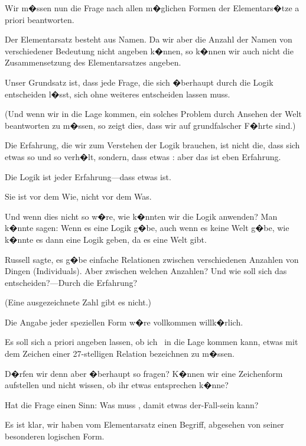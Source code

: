 \begin{propositions}
{Wir m�ssen nun die Frage nach allen m�glichen
Formen der Elementars�tze a priori beantworten.

Der Elementarsatz besteht aus Namen. Da wir
aber die Anzahl der Namen von verschiedener
Bedeutung nicht angeben k�nnen, so k�nnen wir
auch nicht die Zusammensetzung des Elementarsatzes
angeben.}


{Unser Grundsatz ist, dass jede Frage, die sich
�berhaupt durch die Logik entscheiden l�sst, sich
ohne weiteres entscheiden lassen muss.

(Und wenn wir in die Lage kommen, ein solches
Problem durch Ansehen der Welt beantworten zu
m�ssen, so zeigt dies, dass wir auf grundfalscher
F�hrte sind.)}


{Die \glqq{}Erfahrung\grqq{}, die wir zum Verstehen der
Logik brauchen, ist nicht die, dass sich etwas so
und so verh�lt, sondern, dass etwas : aber das
ist eben  Erfahrung.

Die Logik ist  jeder Erfahrung---dass etwas
 ist.

Sie ist vor dem Wie, nicht vor dem Was.}


{Und wenn dies nicht so w�re, wie k�nnten wir
die Logik anwenden? Man k�nnte sagen: Wenn
es eine Logik g�be, auch wenn es keine Welt g�be,
wie k�nnte es dann eine Logik geben, da es eine
Welt gibt.}


{Russell sagte, es g�be einfache Relationen
zwischen verschiedenen Anzahlen von Dingen
(Individuals). Aber zwischen welchen Anzahlen?
Und wie soll sich das entscheiden?---Durch die
Erfahrung?

(Eine ausgezeichnete Zahl gibt es nicht.)}


{Die Angabe jeder speziellen Form w�re vollkommen
willk�rlich.}


{Es soll sich a priori angeben lassen, ob ich \zumBeispiel\ in
die Lage kommen kann, etwas mit dem
Zeichen einer 27-stelligen Relation bezeichnen zu
m�ssen.}


{D�rfen wir denn aber �berhaupt so fragen?
K�nnen wir eine Zeichenform aufstellen und nicht
wissen, ob ihr etwas entsprechen k�nne?

Hat die Frage einen Sinn: Was muss ,
damit etwas der-Fall-sein kann?}


{Es ist klar, wir haben vom Elementarsatz einen
Begriff, abgesehen von seiner besonderen logischen
Form.

}
\end{propositions}
